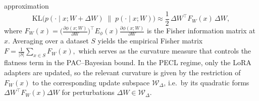 \documentclass[10pt]{article} %
\begin{document}
approximation
$$
\mathrm{KL}\big(
p(\cdot \mid x; W + \Delta W)
\;\big\|\;
p(\cdot \mid x; W)
\big)
\approx
\frac{1}{2}\,
\Delta W^\top F_W(x) \,\Delta W,
$$
where
$
F_W(x)
=
\Big(
\frac{\partial \phi(x; W)}{\partial W}
\Big)^\top
E_\phi(x)
\frac{\partial \phi(x; W)}{\partial W}
$
is the Fisher information matrix at $x$. Averaging over a dataset $S$ yields the empirical Fisher
matrix
$
F
=
\frac{1}{|S|}
\sum_{x \in S} F_W(x),
$
which serves as the curvature measure that controls the flatness term in the PAC--Bayesian bound.
In the PECL regime, only the LoRA adapters are updated, so the relevant curvature is given by the restriction of $F_W(x)$ to the corresponding update subspace $\mathcal W_\Delta$, i.e.\ by its quadratic forms $\Delta W^\top F_W(x)\Delta W$ for perturbations $\Delta W \in \mathcal W_\Delta$.






\end{document}
